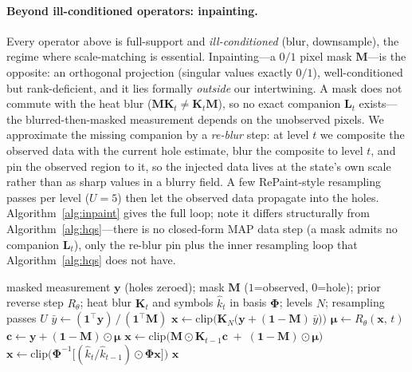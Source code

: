 \documentclass[11pt]{article}
\newcommand{\bm}[1]{\boldsymbol{#1}}  %
\newcommand{\Phimat}{\bm{\Phi}}
\newcommand{\K}{\mathbf{K}}
\newcommand{\x}{\mathbf{x}}
\newcommand{\y}{\mathbf{y}}
\newcommand{\bmu}{\bm{\mu}}
\begin{document}
\paragraph{Beyond ill-conditioned operators: inpainting.}
Every operator above is full-support and \emph{ill-conditioned} (blur, downsample), the regime where
scale-matching is essential. Inpainting---a $0/1$ pixel mask $\mathbf M$---is the opposite: an
orthogonal projection (singular values exactly $0/1$), well-conditioned but rank-deficient, and it
lies formally \emph{outside} our intertwining. A mask does not commute with the heat blur
($\mathbf M\K_t\neq\K_t\mathbf M$), so no exact companion $\mathbf L_t$ exists---the blurred-then-masked
measurement depends on the unobserved pixels. We approximate the missing companion by a \emph{re-blur}
step: at level $t$ we composite the observed data with the current hole estimate, blur the composite to
level $t$, and pin the observed region to it, so the injected data lives at the state's own scale
rather than as sharp values in a blurry field. A few RePaint-style resampling passes per level
($U{=}5$) then let the observed data propagate into the holes. Algorithm~\ref{alg:inpaint} gives the
full loop; note it differs structurally from Algorithm~\ref{alg:hqs}---there is no closed-form MAP
data step (a mask admits no companion $\mathbf L_t$), only the re-blur pin plus the inner resampling
loop that Algorithm~\ref{alg:hqs} does not have.

\begin{algorithm}[h]
\caption{Inpainting via the re-blur companion with RePaint resampling}
\label{alg:inpaint}
\begin{algorithmic}[1]
\Require masked measurement $\y$ (holes zeroed); mask $\mathbf M$ ($1$=observed, $0$=hole); prior
reverse step $R_\theta$; heat blur $\K_t$ and symbols $\hat k_t$ in basis $\Phimat$; levels $N$;
resampling passes $U$
\State $\bar y \gets (\mathbf 1^{\!\top}\y)\,/\,(\mathbf 1^{\!\top}\mathbf M)$
\State $\x \gets \mathrm{clip}\big(\K_N\!\big(\y + (\mathbf 1-\mathbf M)\,\bar y\big)\big)$
    \State $\bmu \gets R_\theta(\x,\,t)$
    \State $\mathbf c \gets \y + (\mathbf 1-\mathbf M)\odot\bmu$
    \State $\x \gets \mathrm{clip}\big(\mathbf M\odot\K_{t-1}\mathbf c \;+\; (\mathbf 1-\mathbf M)\odot\bmu\big)$
      \State $\x \gets \mathrm{clip}\big(\Phimat^{-1}\big[(\hat k_t/\hat k_{t-1})\odot\Phimat\x\big]\big)$
    \EndIf
  \EndFor
\EndFor
\State \Return $\x$
\end{algorithmic}
\end{algorithm}
\end{document}
